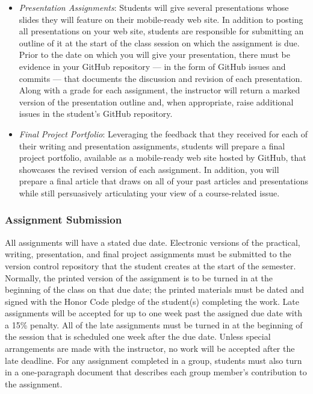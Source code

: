 \begin{itemize}
  \item {\em Presentation Assignments\/}: Students will give several presentations whose slides they will feature on
    their mobile-ready web site. In addition to posting all presentations on your web site, students are responsible for
    submitting an outline of it at the start of the class session on which the assignment is due. Prior to the date on
    which you will give your presentation, there must be evidence in your GitHub repository --- in the form of GitHub
    issues and commits --- that documents the discussion and revision of each presentation. Along with a grade for each
    assignment, the instructor will return a marked version of the presentation outline and, when appropriate, raise
    additional issues in the student's GitHub repository.

  \item {\em Final Project Portfolio\/}: Leveraging the feedback that they received for each of their writing and
    presentation assignments, students will prepare a final project portfolio, available as a mobile-ready web site
    hosted by GitHub, that showcases the revised version of each assignment. In addition, you will prepare a final
    article that draws on all of your past articles and presentations while still persuasively articulating your view of
    a course-related issue.

\end{itemize}
\vspace*{-.1in}

\subsubsection*{Assignment Submission}

All assignments will have a stated due date. Electronic versions of the practical, writing, presentation, and final
project assignments must be submitted to the version control repository that the student creates at the start of the
semester. Normally, the printed version of the assignment is to be turned in at the beginning of the class on that due
date; the printed materials must be dated and signed with the Honor Code pledge of the student(s) completing the work.
Late assignments will be accepted for up to one week past the assigned due date with a 15\% penalty. All of the late
assignments must be turned in at the beginning of the session that is scheduled one week after the due date. Unless
special arrangements are made with the instructor, no work will be accepted after the late deadline. For any assignment
completed in a group, students must also turn in a one-paragraph document that describes each group member's
contribution to the assignment.

